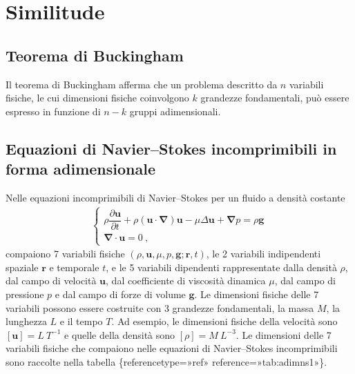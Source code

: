 \documentclass[letterpaper,10pt,italian]{jupyterBook}
\begin{document}
\sphinxstepscope


\chapter{Similitude}
\label{\detokenize{polimi/fluidmechanics-ita/template/capitoli/07_similitudine/07teoria:similitude}}\label{\detokenize{polimi/fluidmechanics-ita/template/capitoli/07_similitudine/07teoria:fluid-mechanics-similitude}}\label{\detokenize{polimi/fluidmechanics-ita/template/capitoli/07_similitudine/07teoria::doc}}

\section{Teorema di Buckingham}
\label{\detokenize{polimi/fluidmechanics-ita/template/capitoli/07_similitudine/07teoria:teorema-di-buckingham}}
\sphinxAtStartPar
Il teorema di Buckingham afferma che un problema descritto da \(n\)
variabili fisiche, le cui dimensioni fisiche coinvolgono \(k\) grandezze
fondamentali, può essere espresso in funzione di \(n-k\) gruppi
adimensionali.


\section{Equazioni di Navier–Stokes incomprimibili in forma adimensionale}
\label{\detokenize{polimi/fluidmechanics-ita/template/capitoli/07_similitudine/07teoria:equazioni-di-navier-stokes-incomprimibili-in-forma-adimensionale}}
\sphinxAtStartPar
Nelle equazioni incomprimibili di Navier–Stokes per un fluido a densità
costante
\begin{equation*}
\begin{split}\begin{cases}
 \rho \dfrac{\partial \mathbf{u}}{\partial t} + \rho (\mathbf{u} \cdot \mathbf{\nabla}) \mathbf{u} - \mu \Delta \mathbf{u} + \mathbf{\nabla} p = \rho \mathbf{g} \\
 \mathbf{\nabla} \cdot \mathbf{u} = 0 \ ,
\end{cases}\end{split}
\end{equation*}
\sphinxAtStartPar
compaiono 7 variabili fisiche
\((\rho,\mathbf{u},\mu,p,\mathbf{g};\mathbf{r},t)\), le 2 variabili indipendenti
spaziale \(\mathbf{r}\) e temporale \(t\), e le 5 variabili dipendenti
rappresentate dalla densità \(\rho\), dal campo di velocità \(\mathbf{u}\), dal
coefficiente di viscosità dinamica \(\mu\), dal campo di pressione \(p\) e
dal campo di forze di volume \(\mathbf{g}\). Le dimensioni fisiche delle 7
variabili possono essere costruite con 3 grandezze fondamentali, la
massa \(M\), la lunghezza \(L\) e il tempo \(T\). Ad esempio, le dimensioni
fisiche della velocità sono \([\mathbf{u}] = L \ T^{-1}\) e quelle della
densità sono \([\rho] = M \ L^{-3}\). Le dimensioni delle 7 variabili
fisiche che compaiono nelle equazioni di Navier–Stokes incomprimibili
sono raccolte nella tabella
\{reference\sphinxhyphen{}type=»ref»
reference=»tab:adim\sphinxhyphen{}ns\sphinxhyphen{}1»\}.
\end{document}
